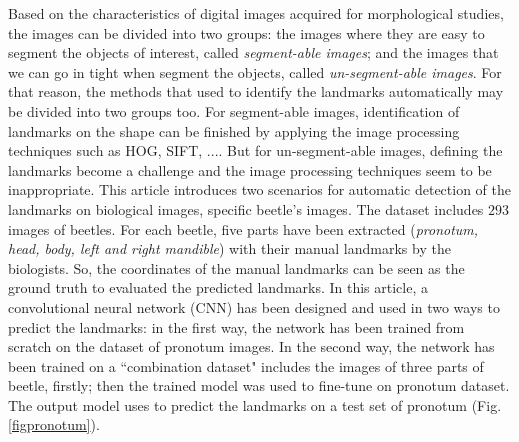 \documentclass[10pt]{article}
\begin{document}
Based on the characteristics of digital images acquired for morphological studies, the images can be divided into two groups: the images where they are easy to segment the objects of interest, called \textit{segment-able images}; and the images that we can go in tight when segment the objects, called \textit{un-segment-able images}. For that reason, the methods that used to identify the landmarks automatically may be divided into two groups too. For segment-able images, identification of landmarks on the shape can be finished by applying the image processing techniques such as HOG\cite{palaniswamy2010automatic}, SIFT\cite{lowe2004distinctive}, .... But for un-segment-able images, defining the landmarks become a challenge and the image processing techniques seem to be inappropriate. This article introduces two scenarios for automatic detection of the landmarks on biological images, specific beetle's images. The dataset includes $293$ images of beetles. For each beetle, five parts have been extracted (\textit{pronotum, head, body, left and right mandible}) with their manual landmarks by the biologists. So, the coordinates of the manual landmarks can be seen as the ground truth to evaluated the predicted landmarks.
In this article, a convolutional neural network (CNN)\cite{lecun2010convolutional} has been designed and used in two ways to predict the landmarks: in the first way, the network has been trained from scratch on the dataset of pronotum images. In the second way, the network has been trained on a  ``combination dataset" includes the images of three parts of beetle, firstly; then the trained model was used to fine-tune on pronotum dataset. The output model uses to predict the landmarks on a test set of pronotum (Fig.\ref{figpronotum}). 




\end{document}
